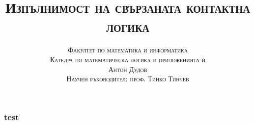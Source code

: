 \documentclass[11pt]{beamer}
\date[\today]{}
\title{\textsc{Изпълнимост на свързаната контактна логика}}
\author[Антон Дудов]{
	\textsc{Факултет по математика и информатика} \\
	\textsc{Катедра по математическа логика и приложенията ѝ} \\ [10mm]
	\textsc{Антон Дудов} \\ [15mm]
	\small\textsc{Научен ръководител: проф. Тинко Тинчев}
}
\begin{document}
\begin{frame}
\titlepage
\end{frame}


\begin{frame}

\frametitle{test}

\end{frame}
\end{document}
